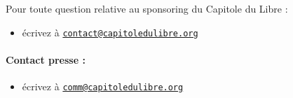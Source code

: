 

Pour toute question relative au sponsoring du Capitole du Libre :
\begin{itemize}
\item[\logo] écrivez à \href{mailto:contact@capitoledulibre.org}{\nolinkurl{contact@capitoledulibre.org}}
\end{itemize}
\paragraph{Contact presse :}
\begin{itemize}
\item[\logo] écrivez à \href{mailto:comm@capitoledulibre.org}{\nolinkurl{comm@capitoledulibre.org}}
\end{itemize}
